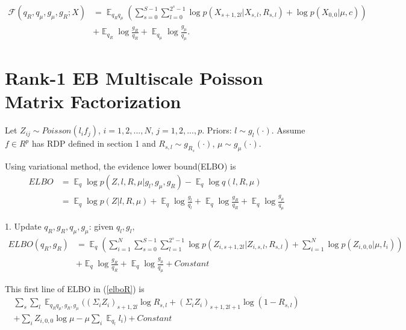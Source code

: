 \documentclass{article}
\DeclareMathOperator{\E}{\mathbb{E}}
\begin{document}
\begin{equation}\label{elboPS}
\begin{split}
    \mathcal{F}(q_R,q_\mu,g_\mu,g_R; X) &= \E_{q_Rq_\mu}(\sum_{s=0}^{S-1}\sum_{l=0}^{2^s-1}\log p(X_{s+1,2l}|X_{s,l},R_{s,l})+\log p(X_{0,0}|\mu,c)) 
    \\ & + \E_{q_R}\log\frac{g_R}{q_R} + \E_{q_\mu}\log\frac{g_\mu}{q_\mu}.
\end{split}
\end{equation}


\section{Rank-1 EB Multiscale Poisson Matrix Factorization}

Let $Z_{ij}\sim Poisson(l_if_j)$, $i=1,2,...,N$, $j=1,2,...,p$. Priors: $l\sim g_l(\cdot)$. Assume $f\in R^p$ has RDP defined in section 1 and $R_{s,l}\sim g_{R_{s}}(\cdot)$, $\mu\sim g_\mu(\cdot)$. 

Using variational method, the evidence lower bound(ELBO) is 
\begin{equation}\label{elbo}
\begin{split}
    ELBO &= \E_q\log p(Z,l,R,\mu|g_l,g_\mu,g_R) - \E_q\log q(l,R,\mu)
    \\&= \E_q \log p(Z|l,R,\mu) + \E_q\log\frac{g_l}{q_l} + \E_q\log\frac{g_R}{q_R} + \E_q\log\frac{g_\mu}{q_\mu}
\end{split}
\end{equation}

1. Update $q_R, g_R,q_\mu,g_\mu$: given $q_l,g_l$,
\begin{equation}\label{elboR}
\begin{split}
    ELBO(q_R, g_R) &  = \E_q(\sum_{i=1}^N\sum_{s=0}^{S-1}\sum_{l=1}^{2^s-1}\log p(Z_{i,s+1,2l}|Z_{i,s,l},R_{s,l})+\sum_{i=1}^N\log 
    p(Z_{i,0,0}|\mu,l_i) )
    \\ &  + \E_q\log\frac{g_R}{q_R} + \E_q\log\frac{g_\mu}{q_\mu} + Constant
\end{split}
\end{equation}

This first line of ELBO in (\ref{elboR}) is 
\begin{equation}\label{elboR1}
\begin{split}
    \sum_s\sum_l \E_{q_R q_\mu,g_R, g_\mu}( (\Sigma_i Z_i)_{s+1,2l}\log R_{s,l} + (\Sigma_i Z_i)_{s+1,2l+1}\log (1-R_{s,l})  \\
   + \sum_i Z_{i,0,0}\log\mu -\mu\sum_i \E_{q_l}l_i )+ Constant
\end{split}
\end{equation}
\end{document}
